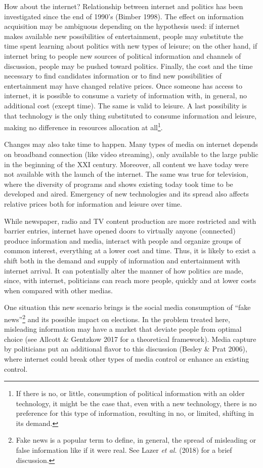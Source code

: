 \documentclass[
  12pt,
]{article}
\begin{document}
How about the internet? Relationship between internet and politics has
been investigated since the end of 1990's (Bimber 1998). The effect on
information acquisition may be ambiguous depending on the hypothesis
used: if internet makes available new possibilities of entertainment,
people may substitute the time spent learning about politics with new
types of leisure; on the other hand, if internet bring to people new
sources of political information and channels of discussion, people may
be pushed toward politics. Finally, the cost and the time necessary to
find candidates information or to find new possibilities of
entertainment may have changed relative prices. Once someone has access
to internet, it is possible to consume a variety of information with, in
general, no additional cost (except time). The same is valid to leisure.
A last possibility is that technology is the only thing substituted to
consume information and leisure, making no difference in resources
allocation at all\footnote{If there is no, or little, consumption of
  political information with an older technology, it might be the case
  that, even with a new technology, there is no preference for this type
  of information, resulting in no, or limited, shifting in its demand.}.

Changes may also take time to happen. Many types of media on internet
depends on broadband connection (like video streaming), only available
to the large public in the beginning of the XXI century. Moreover, all
content we have today were not available with the launch of the
internet. The same was true for television, where the diversity of
programs and shows existing today took time to be developed and aired.
Emergency of new technologies and its spread also affects relative
prices both for information and leisure over time.

While newspaper, radio and TV content production are more restricted and
with barrier entries, internet have opened doors to virtually anyone
(connected) produce information and media, interact with people and
organize groups of common interest, everything at a lower cost and time.
Thus, it is likely to exist a shift both in the demand and supply of
information and entertainment with internet arrival. It can potentially
alter the manner of how politics are made, since, with internet,
politicians can reach more people, quickly and at lower costs when
compared with other medias.

One situation this new scenario brings is the social media consumption
of ``fake news''\footnote{Fake news is a popular term to define, in
  general, the spread of misleading or false information like if it were
  real. See Lazer \emph{et al.} (2018) for a brief discussion.} and its
possible impact on elections. In the problem treated here, misleading
information may have a market that deviate people from optimal choice
(see Allcott \& Gentzkow 2017 for a theoretical framework). Media
capture by politicians put an additional flavor to this discussion
(Besley \& Prat 2006), where internet could break other types of media
control or enhance an existing control.
\end{document}
